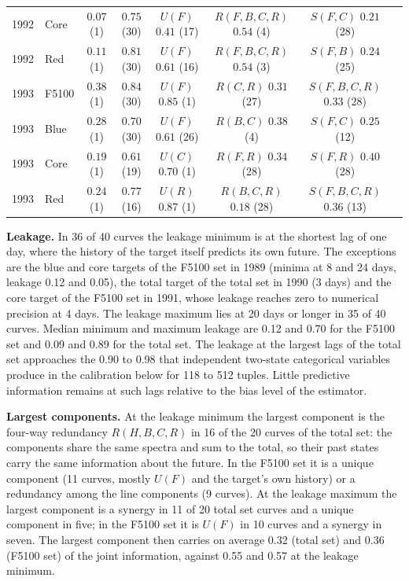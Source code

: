 \documentclass[fleqn,usenatbib]{mnras}
\newenvironment{SURDtable}{\begin{table}}{\end{table}}
\begin{document}
\begin{SURDtable}
\begin{tabular}{rlcccccc}
1992 & Core & $0.07$ (1) & $0.75$ (30) & $U(F)$ $0.41$ (17) & $R(F,B,C,R)$ $0.54$ (4) & $S(F,C)$ $0.21$ (28) \\
1992 & Red & $0.11$ (1) & $0.81$ (30) & $U(F)$ $0.61$ (16) & $R(F,B,C,R)$ $0.54$ (3) & $S(F,B)$ $0.24$ (25) \\
\midrule
1993 & F5100 & $0.38$ (1) & $0.84$ (30) & $U(F)$ $0.85$ (1) & $R(C,R)$ $0.31$ (27) & $S(F,B,C,R)$ $0.33$ (28) \\
1993 & Blue & $0.28$ (1) & $0.70$ (30) & $U(F)$ $0.61$ (26) & $R(B,C)$ $0.38$ (4) & $S(F,C)$ $0.25$ (12) \\
1993 & Core & $0.19$ (1) & $0.61$ (19) & $U(C)$ $0.70$ (1) & $R(F,R)$ $0.34$ (28) & $S(F,R)$ $0.40$ (28) \\
1993 & Red & $0.24$ (1) & $0.77$ (16) & $U(R)$ $0.87$ (1) & $R(B,C,R)$ $0.18$ (28) & $S(F,B,C,R)$ $0.36$ (13) \\
\bottomrule
\end{tabular}

\end{SURDtable}

\textbf{Leakage.} In 36 of 40 curves the leakage minimum is at the shortest lag of
one day, where the history of the target itself predicts its own future. The
exceptions are the blue and core targets of the F5100 set in 1989 (minima at 8 and
24 days, leakage 0.12 and 0.05), the total target of the total set in 1990 (3 days)
and the core target of the F5100 set in 1991, whose leakage reaches zero to numerical
precision at 4 days. The leakage maximum lies at 20 days or longer in 35 of 40
curves. Median minimum and maximum leakage are 0.12 and 0.70 for the F5100 set and
0.09 and 0.89 for the total set. The leakage at the largest lags of the total set
approaches the 0.90 to 0.98 that independent two-state categorical variables produce in the
calibration below for 118 to 512 tuples. Little predictive information remains at
such lags relative to the bias level of the estimator.

\textbf{Largest components.} At the leakage minimum the largest component is the
four-way redundancy $R(H,B,C,R)$ in 16 of the 20 curves of the total set: the
components share the same spectra and sum to the total, so their past states carry
the same information about the future. In the F5100 set it is a unique component
(11 curves, mostly $U(F)$ and the target's own history) or a redundancy among the
line components (9 curves). At the leakage maximum the largest component is a
synergy in 11 of 20 total set curves and a unique component in five; in the F5100 set
it is $U(F)$ in 10 curves and a synergy in seven. The largest component then carries
on average 0.32 (total set) and 0.36 (F5100 set) of the joint information, against
0.55 and 0.57 at the leakage minimum.
\end{document}
